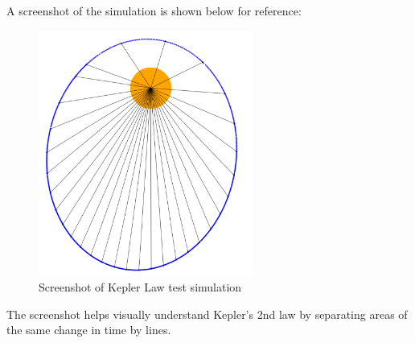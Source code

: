 A screenshot of the simulation is shown below for reference:

\begin{figure}[h] 
	\centering
		\includegraphics[width=7cm]{Figures/keplerscreenshot.png}
	\caption{Screenshot of Kepler Law test simulation}
	\label{fig:sun1}
\end{figure}

The screenshot helps visually understand Kepler's 2nd law by separating areas of the same change in time by lines.





























